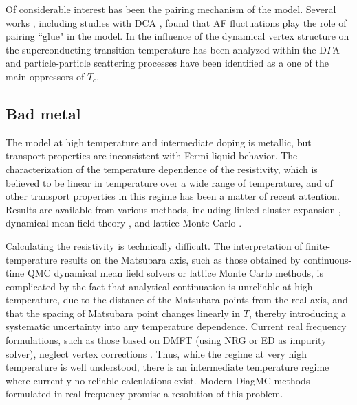 \documentclass{ar-1col}
\begin{document}
Of considerable interest has been the pairing mechanism of the model. Several works \cite{Monthoux91,Scalapino95}, including studies with DCA \cite{Maier06,Maier06B,Maier07,Maier07B,Gull14}, found that AF fluctuations play the role of pairing ``glue" in the model. In \cite{Kitatani19} the influence of the dynamical vertex structure on the superconducting transition temperature has been analyzed within the D$\Gamma$A and particle-particle scattering processes have been identified as a one of the main oppressors of $T_c$.

\subsection{Bad metal}
The model at high temperature and intermediate doping is metallic, but transport properties are inconsistent with Fermi liquid behavior. The characterization of the temperature dependence of the resistivity, which is believed to be linear in temperature over a wide range of temperature, and of other transport properties in this regime has been a matter of recent attention. Results are available from various methods, including linked cluster expansion \cite{Perepelitsky16}, dynamical mean field theory \cite{Pruschke95,Deng13,Perepelitsky16,Cha20}, and lattice Monte Carlo \cite{Huang19}.

Calculating the resistivity is technically difficult. The interpretation of finite-temperature results on the Matsubara axis, such as those obtained by continuous-time QMC dynamical mean field solvers or lattice Monte Carlo methods, is complicated by the fact that analytical continuation is unreliable at high temperature, due to the distance of the Matsubara points from the real axis, and that the spacing of Matsubara point changes linearly in $T$, thereby introducing a systematic uncertainty into any temperature dependence.
Current real frequency formulations, such as those based on DMFT (using NRG \cite{Deng13} or ED \cite{Cha20} as impurity solver), neglect vertex corrections \cite{Vucicevic19}. Thus, while the regime at very high temperature is well understood, there is an intermediate temperature regime where currently no reliable calculations exist. Modern DiagMC methods formulated in real frequency \cite{Taheridehkordi20} promise a resolution of this problem.\begin{marginnote}
\end{marginnote}
\end{document}
